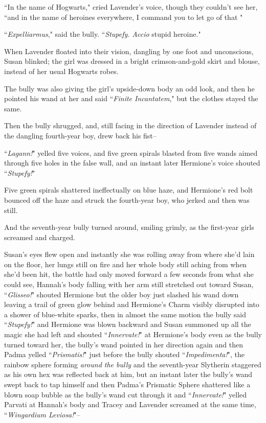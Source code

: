 ``In the name of Hogwarts," cried Lavender's voice, though they couldn't see her, ``and in the name of heroines everywhere, I command you to let go of that "

``\emph{Expelliarmus}," said the bully. ``\emph{Stupefy.} \emph{Accio} stupid heroine."

When Lavender floated into their vision, dangling by one foot and unconscious, Susan blinked; the girl was dressed in a bright crimson-and-gold skirt and blouse, instead of her usual Hogwarts robes.

The bully was also giving the girl's upside-down body an odd look, and then he pointed his wand at her and said ``\emph{Finite Incantatem}," but the clothes stayed the same.

Then the bully shrugged, and, still facing in the direction of Lavender instead of the dangling fourth-year boy, drew back his fist\---

``\emph{Lagann!}" yelled five voices, and five green spirals blasted from five wands aimed through five holes in the false wall, and an instant later Hermione's voice shouted ``\emph{Stupefy!}"

Five green spirals shattered ineffectually on blue haze, and Hermione's red bolt bounced off the haze and struck the fourth-year boy, who jerked and then was still.

And the seventh-year bully turned around, smiling grimly, as the first-year girls screamed and charged.

\later

Susan's eyes flew open and instantly she was rolling away from where she'd lain on the floor, her lungs still on fire and her whole body still aching from when she'd been hit, the battle had only moved forward a few seconds from what she could see, Hannah's body falling with her arm still stretched out toward Susan, ``\emph{Glisseo!}" shouted Hermione but the older boy just slashed his wand down leaving a trail of green glow behind and Hermione's Charm visibly disrupted into a shower of blue-white sparks, then in almost the same motion the bully said ``\emph{Stupefy!}" and Hermione was blown backward and Susan summoned up all the magic she had left and shouted ``\emph{Innervate!}" at Hermione's body even as the bully turned toward her, the bully's wand pointed in her direction again and then Padma yelled ``\emph{Prismatis!}" just before the bully shouted ``\emph{Impedimenta!}", the rainbow sphere forming \emph{around the bully} and the seventh-year Slytherin staggered as his own hex was reflected back at him, but an instant later the bully's wand swept back to tap himself and then Padma's Prismatic Sphere shattered like a blown soap bubble as the bully's wand cut through it and ``\emph{Innervate!}" yelled Parvati at Hannah's body and Tracey and Lavender screamed at the same time, ``\emph{Wingardium Leviosa!}"\---

